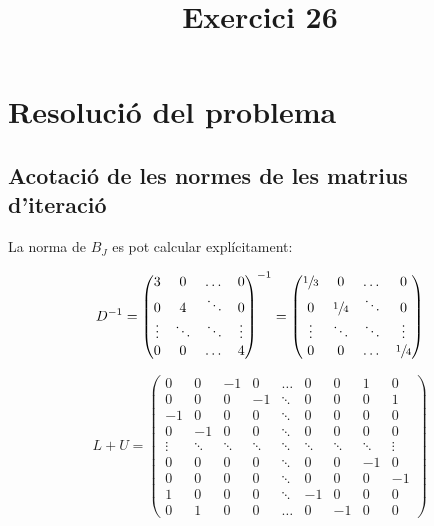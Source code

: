 \documentclass[12pt]{article}
\title{Exercici 26}
\newcommand{\T}{\sfrac{1}{3}} %
\newcommand{\F}{\sfrac{1}{4}} %
\begin{document}
\section{Resolució del problema}

\renewcommand{\thesubsection}{\alph{subsection}}

\subsection{Acotació de les normes de les matrius d'iteració}

La norma de $B_J$ es pot calcular explícitament:

\begin{equation*}
D^{-1}=
\begin{pmatrix}
    3       & 0       & \dots   & 0       \\
    0       & 4       & \ddots  & 0       \\
    \vdots  & \ddots  & \ddots  & \vdots  \\
    0       & 0       & \dots   & 4
\end{pmatrix}^{-1}=
\begin{pmatrix}
    \T      & 0       & \dots   & 0       \\
    0       & \F      & \ddots  & 0       \\
    \vdots  & \ddots  & \ddots  & \vdots  \\
    0       & 0       & \dots   & \F
\end{pmatrix}
\end{equation*}

\begin{equation*}
L+U=
\begin{pmatrix}
    0       & 0       & -1      & 0       & \dots   & 0       & 0       & 1       & 0       \\
    0       & 0       & 0       & -1      & \ddots  & 0       & 0       & 0       & 1       \\
    -1      & 0       & 0       & 0       & \ddots  & 0       & 0       & 0       & 0       \\
    0       & -1      & 0       & 0       & \ddots  & 0       & 0       & 0       & 0       \\
    \vdots  & \ddots  & \ddots  & \ddots  & \ddots  & \ddots  & \ddots  & \ddots  & \vdots  \\
    0       & 0       & 0       & 0       & \ddots  & 0       & 0       & -1      & 0       \\
    0       & 0       & 0       & 0       & \ddots  & 0       & 0       & 0       & -1      \\
    1       & 0       & 0       & 0       & \ddots  & -1      & 0       & 0       & 0       \\
    0       & 1       & 0       & 0       & \dots   & 0       & -1      & 0       & 0
\end{pmatrix}
\end{equation*}
\end{document}
